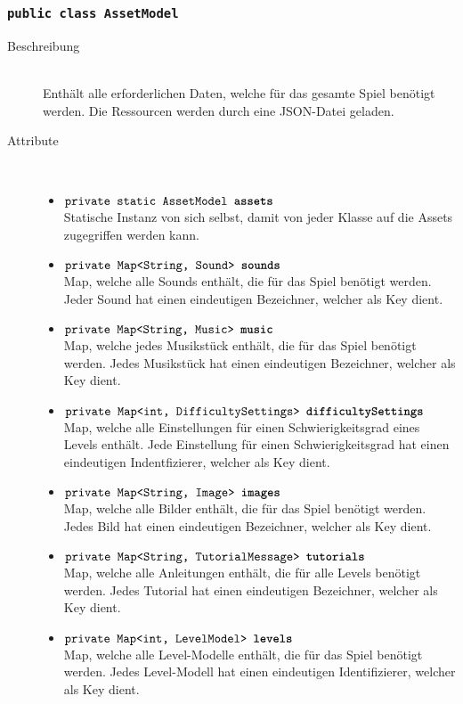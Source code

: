 	

\subsubsection{\normalfont \texttt{public class \textbf{AssetModel}}}

\begin{description}
\item[Beschreibung] \hfill \\ Enthält alle erforderlichen Daten, welche für das gesamte Spiel benötigt werden. Die Ressourcen werden durch eine JSON-Datei geladen.
\item[Attribute] \hfill \\
	\vspace{-.8cm}
	\begin{itemize}	
		\item $\texttt{private static AssetModel \textbf{assets}}$ \\ Statische Instanz von sich selbst, damit von jeder Klasse auf die Assets zugegriffen werden kann.
		\item $\texttt{private Map<String, Sound> \textbf{sounds}}$ \\ Map, welche alle Sounds enthält, die für das Spiel benötigt werden. Jeder Sound hat einen eindeutigen Bezeichner, welcher als Key dient.
		\item $\texttt{private Map<String, Music> \textbf{music}}$ \\ Map, welche jedes Musikstück enthält, die für das Spiel benötigt werden. Jedes Musikstück hat einen eindeutigen Bezeichner, welcher als Key dient.
		\item $\texttt{private Map<int, DifficultySettings> \textbf{difficultySettings}}$ \\ Map, welche alle Einstellungen für einen Schwierigkeitsgrad eines Levels enthält. Jede Einstellung für einen Schwierigkeitsgrad hat einen eindeutigen Indentfizierer, welcher als Key dient.
		\item $\texttt{private Map<String, Image> \textbf{images}}$ \\ Map, welche alle Bilder enthält, die für das Spiel benötigt werden. Jedes Bild hat einen eindeutigen Bezeichner, welcher als Key dient.
		\item $\texttt{private Map<String, TutorialMessage> \textbf{tutorials}}$ \\ Map, welche alle Anleitungen enthält, die für alle Levels benötigt werden. Jedes Tutorial hat einen eindeutigen Bezeichner, welcher als Key dient.
		\item $\texttt{private Map<int, LevelModel> \textbf{levels}}$ \\ Map, welche alle Level-Modelle enthält, die für das Spiel benötigt werden. Jedes Level-Modell hat einen eindeutigen Identifizierer, welcher als Key dient.


\end{itemize}
\end{description}
